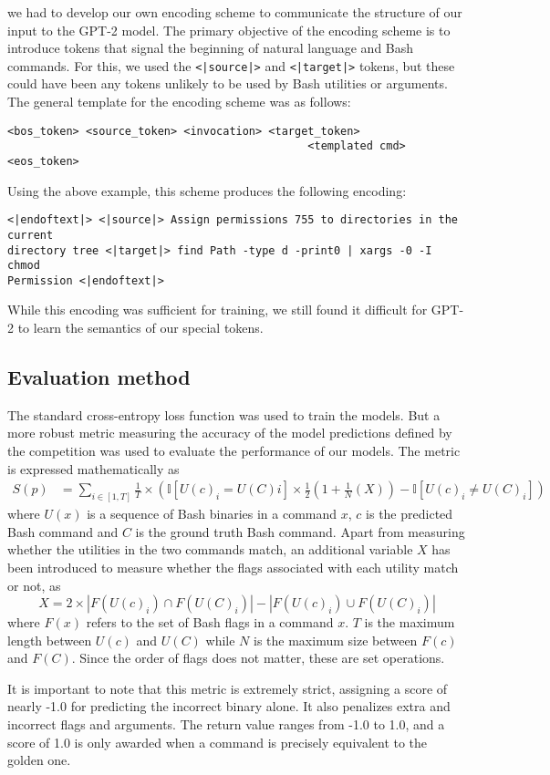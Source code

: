 we had to develop our own encoding scheme to communicate the structure of our
input to the GPT-2 model. The primary objective of the encoding scheme is to
introduce tokens that signal the beginning of natural language and Bash commands. For this, we used the \texttt{<|source|>} and \texttt{<|target|>} tokens, but these could have been any tokens unlikely to be used by Bash utilities or arguments. The general template for the encoding scheme was as follows:
\begin{verbatim}
<bos_token> <source_token> <invocation> <target_token>
                                              <templated cmd> <eos_token> 
\end{verbatim}
Using the above example, this scheme produces the following encoding:
\begin{verbatim}
<|endoftext|> <|source|> Assign permissions 755 to directories in the current
directory tree <|target|> find Path -type d -print0 | xargs -0 -I chmod 
Permission <|endoftext|>
\end{verbatim}
While this encoding was sufficient for training, we still found it difficult
for GPT-2 to learn the semantics of our special tokens.


\subsection{Evaluation method}
The standard cross-entropy loss function was used to train the models. But a
more robust metric measuring the accuracy of the model predictions defined by
the competition was used to evaluate the performance of our models. The metric
is expressed mathematically as
\begin{align*}
	S(p) & =\sum_{i\in[1,T]}\frac{1}{T}\times\left(
	\mathbb{I}[U(c)_i=U(C)i]\times\frac{1}{2}\left(
		1+\frac{1}{N}\left(X\right)\right) -\mathbb{I}[U(c)_i\ne U(C)_i]
	\right)
\end{align*}
where $U(x)$ is a sequence of Bash binaries in a command $x$, $c$ is the
predicted Bash command and $C$ is the ground truth Bash command. Apart from
measuring whether the utilities in the two commands match, an additional
variable $X$ has been introduced to measure whether the flags associated with
each utility match or not, as
\begin{equation*}
	X = 2\times
	|F(U(c)_i)\cap F(U(C)_i)| - |F(U(c)_i)\cup F(U(C)_i)|
\end{equation*}
where $F(x)$ refers to the set of Bash flags in a command $x$. $T$ is the
maximum length between $U(c)$ and $U(C)$ while $N$ is the maximum size between
$F(c)$ and $F(C)$. Since the order of flags does not matter, these are set
operations.
\par
It is important to note that this metric is extremely strict, assigning a score
of nearly -1.0 for predicting the incorrect binary alone. It also penalizes
extra and incorrect flags and arguments. The return value ranges from -1.0 to
1.0, and a score of 1.0 is only awarded when a command is precisely equivalent
to the golden one.
